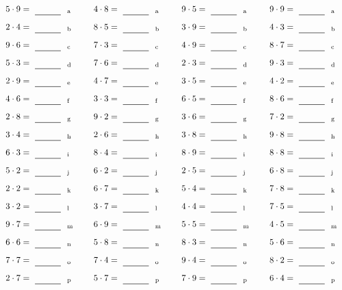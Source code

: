 \documentclass
[
  draft    = true,
  fontsize = 11pt,
  parskip  = half-
]
{scrartcl}
\begin{document}
\par\vfill\par
\begin{align*}
    \pline{5\cdot9}&=\rline{a}
  & \pline{4\cdot8}&=\rline{a}
  & \pline{9\cdot5}&=\rline{a}
  & \pline{9\cdot9}&=\rline{a} \\[1ex]
    \pline{2\cdot4}&=\rline{b}
  & \pline{8\cdot5}&=\rline{b}
  & \pline{3\cdot9}&=\rline{b}
  & \pline{4\cdot3}&=\rline{b} \\[1ex]
    \pline{9\cdot6}&=\rline{c}
  & \pline{7\cdot3}&=\rline{c}
  & \pline{4\cdot9}&=\rline{c}
  & \pline{8\cdot7}&=\rline{c} \\[1ex]
    \pline{5\cdot3}&=\rline{d}
  & \pline{7\cdot6}&=\rline{d}
  & \pline{2\cdot3}&=\rline{d}
  & \pline{9\cdot3}&=\rline{d} \\[1ex]
    \pline{2\cdot9}&=\rline{e}
  & \pline{4\cdot7}&=\rline{e}
  & \pline{3\cdot5}&=\rline{e}
  & \pline{4\cdot2}&=\rline{e} \\[1ex]
    \pline{4\cdot6}&=\rline{f}
  & \pline{3\cdot3}&=\rline{f}
  & \pline{6\cdot5}&=\rline{f}
  & \pline{8\cdot6}&=\rline{f} \\[1ex]
    \pline{2\cdot8}&=\rline{g}
  & \pline{9\cdot2}&=\rline{g}
  & \pline{3\cdot6}&=\rline{g}
  & \pline{7\cdot2}&=\rline{g} \\[1ex]
    \pline{3\cdot4}&=\rline{h}
  & \pline{2\cdot6}&=\rline{h}
  & \pline{3\cdot8}&=\rline{h}
  & \pline{9\cdot8}&=\rline{h} \\[1ex]
    \pline{6\cdot3}&=\rline{i}
  & \pline{8\cdot4}&=\rline{i}
  & \pline{8\cdot9}&=\rline{i}
  & \pline{8\cdot8}&=\rline{i} \\[1ex]
    \pline{5\cdot2}&=\rline{j}
  & \pline{6\cdot2}&=\rline{j}
  & \pline{2\cdot5}&=\rline{j}
  & \pline{6\cdot8}&=\rline{j} \\[1ex]
    \pline{2\cdot2}&=\rline{k}
  & \pline{6\cdot7}&=\rline{k}
  & \pline{5\cdot4}&=\rline{k}
  & \pline{7\cdot8}&=\rline{k} \\[1ex]
    \pline{3\cdot2}&=\rline{l}
  & \pline{3\cdot7}&=\rline{l}
  & \pline{4\cdot4}&=\rline{l}
  & \pline{7\cdot5}&=\rline{l} \\[1ex]
    \pline{9\cdot7}&=\rline{m}
  & \pline{6\cdot9}&=\rline{m}
  & \pline{5\cdot5}&=\rline{m}
  & \pline{4\cdot5}&=\rline{m} \\[1ex]
    \pline{6\cdot6}&=\rline{n}
  & \pline{5\cdot8}&=\rline{n}
  & \pline{8\cdot3}&=\rline{n}
  & \pline{5\cdot6}&=\rline{n} \\[1ex]
    \pline{7\cdot7}&=\rline{o}
  & \pline{7\cdot4}&=\rline{o}
  & \pline{9\cdot4}&=\rline{o}
  & \pline{8\cdot2}&=\rline{o} \\[1ex]
    \pline{2\cdot7}&=\rline{p}
  & \pline{5\cdot7}&=\rline{p}
  & \pline{7\cdot9}&=\rline{p}
  & \pline{6\cdot4}&=\rline{p}
\end{align*}
\end{document}
